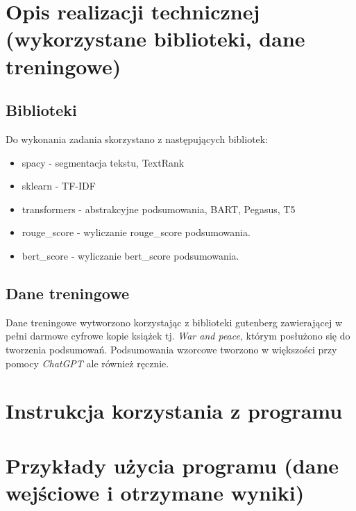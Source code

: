 \documentclass{article}
\begin{document}
\section{Opis realizacji technicznej (wykorzystane biblioteki, dane treningowe)}
\subsection{Biblioteki}
Do wykonania zadania skorzystano z następujących bibliotek:
\begin{itemize}
	\item spacy - segmentacja tekstu, TextRank
	\item sklearn - TF-IDF
	\item transformers - abstrakcyjne podsumowania, BART, Pegasus, T5
	\item rouge\_score - wyliczanie rouge\_score podsumowania.
	\item bert\_score - wyliczanie bert\_score podsumowania.
\end{itemize}
\subsection{Dane treningowe}
Dane treningowe wytworzono korzystając z biblioteki gutenberg \cite{gutenberg}
zawierającej w pełni darmowe cyfrowe kopie książek tj. \textit{War and peace}, którym
posłużono się do tworzenia podsumowań. Podsumowania wzorcowe tworzono w większości przy pomocy
\textit{ChatGPT} ale również ręcznie.

\section{Instrukcja korzystania z programu}
\section{Przykłady użycia programu (dane wejściowe i otrzymane wyniki)}



\end{document}

